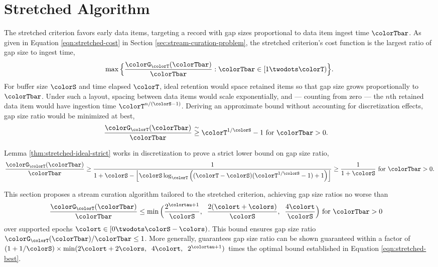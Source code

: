 \section{Stretched Algorithm} \label{sec:stretched}

The stretched criterion favors early data items, targeting a record with gap sizes proportional to data item ingest time $\colorTbar$.
As given in Equation \ref{eqn:stretched-cost} in Section \ref{sec:stream-curation-problem}, the stretched criterion's cost function is the largest ratio of gap size to ingest time,
\begin{align*}
\max\Big\{\frac{\colorG_{\colorT}(\colorTbar)}{\colorTbar} : \colorTbar \in [1 \twodots \colorT)\Big\}.
\end{align*}
For buffer size $\colorS$ and time elapsed $\colorT$, ideal retention would space retained items so that gap size grows proportionally to $\colorTbar$.
Under such a layout, spacing between data items would scale exponentially, and --- counting from zero --- the $n$th retained data item would have ingestion time $\colorT^{n/(\colorS - 1)}$.
Deriving an approximate bound without accounting for discretization effects, gap size ratio would be minimized at best,
\begin{align}
\label{eqn:approx-gap-bound}
\frac{\colorG_{\colorT}(\colorTbar)}{\colorTbar}
&\stackrel{\sim}{\geq}
\colorT^{1/\colorS} - 1
\text{ for }
\colorTbar > 0.
\end{align}

Lemma \ref{thm:stretched-ideal-strict} works in discretization to prove a strict lower bound on gap size ratio,
\begin{align}
\frac{\colorG_{\colorT}(\colorTbar)}{\colorTbar}
\geq
\frac{
  1
}{
  1 + \colorS
  - \left\lfloor \colorS \log_{\colorT}\Big(
    (\colorT - \colorS)(\colorT^{1/\colorS} - 1) + 1
  \Big)\right\rfloor
}
\geq
\frac{
  1
}{
  1 + \colorS
}
\text{ for }
\colorTbar > 0.
\label{eqn:stretched-best}
\end{align}

This section proposes a stream curation algorithm tailored to the stretched criterion, achieving gap size ratios no worse than
\begin{align}
\frac{\colorG_{\colorT}(\colorTbar)}{\colorTbar}
&\leq
\min\Big(
  \frac{2^{\colortau + 1}}{\colorS},\;\;
  \frac{2(\colort + \colors)}{\colorS},\;\;
  \frac{4\colort}{\colorS}
\Big)
\text{ for }
\colorTbar > 0
\label{eqn:stretchednoworse}
\end{align}
over supported epochs $\colort \in [0\twodots\colorS - \colors)$.
This bound ensures gap size ratio ${\colorG_{\colorT}(\colorTbar)}/{\colorTbar} \leq 1$.
More generally, guarantees gap size ratio can be shown guaranteed within a factor of $(1 + 1/\colorS)\times\min(2\colort + 2\colors, \;\; 4\colort, \;\; 2^{\colortau + 1})$ times the optimal bound established in Equation \ref{eqn:stretched-best}.


